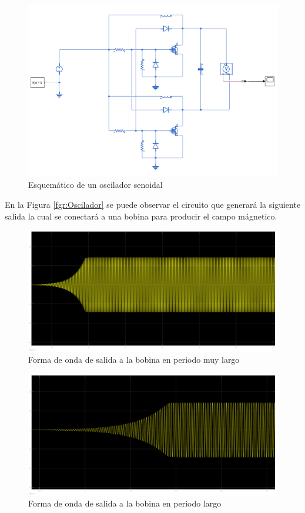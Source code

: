 \documentclass[12pt]{article}
\begin{document}
\begin{figure}[H]
\centering
\includegraphics[scale=0.75]{src/images/Oscilador.png}
\caption{Esquemático de un oscilador senoidal}
\label{fgr:Oscilador}
\end{figure}

En la Figura \eqref{fgr:Oscilador} se puede observar el circuito que generará la siguiente salida la cual se conectará a una bobina para producir el campo mágnetico.

\begin{figure}[H]
\centering
\includegraphics[scale=0.3]{src/images/Onda_larga.png}
\caption{Forma de onda de salida a la bobina en periodo muy largo}
\label{fgr:Onda_super_larga}
\end{figure}

\begin{figure}[H]
\centering
\includegraphics[scale=0.3]{src/images/Onda_corta.png}
\caption{Forma de onda de salida a la bobina en periodo largo}
\label{fgr:Onda_larga}
\end{figure}
\end{document}
